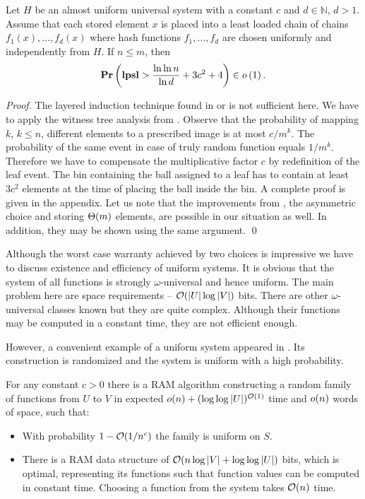 \begin{theorem}
\label{theorem-universal-hashing-two-choices}
Let $H$ be an almost uniform universal system with a constant $c$ and $d \in \mathbb{N}$, $d > 1$. Assume that each stored element $x$ is placed into a least loaded chain of chains $f_1(x), \dots, f_d(x)$ where hash functions $f_1, \dots, f_d$ are chosen uniformly and independently from $H$. If $n \leq m$, then $$\mathbf{Pr}\left(\mathbf{lpsl} > \frac{\ln \ln n}{\ln d} + 3c^2 + 4\right) \in o\left(1\right).$$
\end{theorem}
\begin{proof}
The layered induction technique found in \cite{Mitzenmacher:2005:PCR:1076315} or \cite{DBLP:conf/stoc/AzarBKU94} is not sufficient here. 
We have to apply the witness tree analysis from \cite{DBLP:journals/jacm/Vocking03}. 
Observe that the probability of mapping $k$, $k \leq n$, different elements to a prescribed image is at most ${c}/{m^k}$. 
The probability of the same event in case of truly random function equals ${1}/{m^k}$. 
Therefore we have to compensate the multiplicative factor $c$ by redefinition of the leaf event. 
The bin containing the ball assigned to a leaf has to contain at least $3c^2$ elements at the time of placing the ball inside the bin.
A complete proof is given in the appendix.
Let us note that the improvements from \cite{DBLP:journals/jacm/Vocking03}, the asymmetric choice and storing $\mathrm{\Theta}(m)$ elements, are possible in our situation as well. 
In addition, they may be shown using the same argument.
\qed
\end{proof}

Although the worst case warranty achieved by two choices is impressive we have to discuss existence and efficiency of uniform systems. It is obvious that the system of all functions is strongly $\omega$-universal and hence uniform. The main problem here are space requirements -- $\mathcal{O}(|U| \log |V|)$ bits. There are other $\omega$-universal classes known but they are quite complex. Although their functions may be computed in a constant time, they are not efficient enough. 

However, a convenient example of a uniform system appeared in \cite{DBLP:journals/siamcomp/PaghP08}. Its construction is randomized and the system is uniform with a high probability.
\begin{theorem}
\label{theorem-uniform-system}
For any constant $c > 0$ there is a RAM algorithm constructing a random family of functions from $U$ to $V$ in expected $o(n) + (\log \log|U|)^{\mathcal{O}(1)}$ time and $o(n)$ words of space, such that:
\begin{itemize}
\item With probability $1 - \mathcal{O}(1 / n^c)$ the family is uniform on $S$.
\item There is a RAM data structure of $\mathcal{O}(n \log|V| + \log \log|U|)$ bits, which is optimal, representing its functions such that function values can be computed in constant time. Choosing a function from the system takes $\mathcal{O}(n)$ time.
\end{itemize}
\end{theorem}

